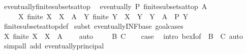 \begin{isabellebody}
\isanewline
{}\isamarkupfalse%
\ eventually{\isacharunderscore}{\kern0pt}finite{\isacharunderscore}{\kern0pt}subsets{\isacharunderscore}{\kern0pt}at{\isacharunderscore}{\kern0pt}top{\isacharcolon}{\kern0pt}\isanewline
\ \ {\isachardoublequoteopen}eventually\ P\ {\isacharparenleft}{\kern0pt}finite{\isacharunderscore}{\kern0pt}subsets{\isacharunderscore}{\kern0pt}at{\isacharunderscore}{\kern0pt}top\ A{\isacharparenright}{\kern0pt}\ {\isasymlongleftrightarrow}\isanewline
\ \ \ \ \ {\isacharparenleft}{\kern0pt}{\isasymexists}X{\isachardot}{\kern0pt}\ finite\ X\ {\isasymand}\ X\ {\isasymsubseteq}\ A\ {\isasymand}\ {\isacharparenleft}{\kern0pt}{\isasymforall}Y{\isachardot}{\kern0pt}\ finite\ Y\ {\isasymand}\ X\ {\isasymsubseteq}\ Y\ {\isasymand}\ Y\ {\isasymsubseteq}\ A\ {\isasymlongrightarrow}\ P\ Y{\isacharparenright}{\kern0pt}{\isacharparenright}{\kern0pt}{\isachardoublequoteclose}\isanewline
%
\isadelimproof
\ \ %
\endisadelimproof
%
\isatagproof
{}\isamarkupfalse%
\ finite{\isacharunderscore}{\kern0pt}subsets{\isacharunderscore}{\kern0pt}at{\isacharunderscore}{\kern0pt}top{\isacharunderscore}{\kern0pt}def\isanewline
{}\isamarkupfalse%
\ {\isacharparenleft}{\kern0pt}subst\ eventually{\isacharunderscore}{\kern0pt}INF{\isacharunderscore}{\kern0pt}base{\isacharcomma}{\kern0pt}\ goal{\isacharunderscore}{\kern0pt}cases{\isacharparenright}{\kern0pt}\isanewline
\ \ \isamarkupfalse%
\ {\isachardoublequoteopen}{\isacharbraceleft}{\kern0pt}X{\isachardot}{\kern0pt}\ finite\ X\ {\isasymand}\ X\ {\isasymsubseteq}\ A{\isacharbraceright}{\kern0pt}\ {\isasymnoteq}\ {\isacharbraceleft}{\kern0pt}{\isacharbraceright}{\kern0pt}{\isachardoublequoteclose}\ \isamarkupfalse%
\ auto\isanewline
{}\isamarkupfalse%
\isanewline
\ \ \isamarkupfalse%
\ {\isacharparenleft}{\kern0pt}{}\ B\ C{\isacharparenright}{\kern0pt}\isanewline
\ \ \isamarkupfalse%
\ {\isacharquery}{\kern0pt}case\ \isamarkupfalse%
\ {\isacharparenleft}{\kern0pt}intro\ bexI{\isacharbrackleft}{\kern0pt}of\ {\isacharunderscore}{\kern0pt}\ {\isachardoublequoteopen}B\ {\isasymunion}\ C{\isachardoublequoteclose}{\isacharbrackright}{\kern0pt}{\isacharparenright}{\kern0pt}\ auto\isanewline
{}\isamarkupfalse%
\ {\isacharparenleft}{\kern0pt}simp{\isacharunderscore}{\kern0pt}all\ add{\isacharcolon}{\kern0pt}\ eventually{\isacharunderscore}{\kern0pt}principal{\isacharparenright}{\kern0pt}%
\endisatagproof
{\isafoldproof}%
%
\isadelimproof
\isanewline
%
\endisadelimproof

\end{isabellebody}
